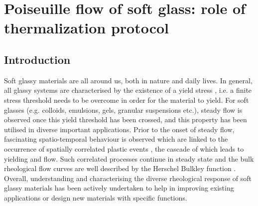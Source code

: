\pagestyle{fancy}
\fancyhf{}
\renewcommand{\headrulewidth}{0pt}
\fancyfoot[C]{\leftmark}
\fancyhead[R]{\thepage}
\doublespacing
\chapter{Poiseuille flow of soft glass: role of thermalization protocol}\label{chap5}

\noindent{}


\section{Introduction}

Soft glassy materials are all around us, both in nature and daily lives. In general, all glassy systems are characterised by the existence of a yield stress \cite{coussot2014yield, bonn2017yield, joshi2018yield}, i.e. a finite stress threshold needs to be overcome in order for the material to yield. For soft glasses (e.g. colloids, emulsions, gels, granular suspensions etc.), steady flow is observed once this yield threshold has been crossed, and this property has been utilised in diverse important applications. Prior to the onset of steady flow, fascinating spatio-temporal behaviour \cite{rodney2011modeling} is observed which are linked to the  occurrence of spatially correlated plastic events \cite{bocquet2009kinetic, nicolas2018deformation}, the cascade of which leads to yielding and flow. Such correlated processes continue in steady state and the bulk rheological flow curves are well described by the Herschel Bulkley function \cite{bonn2017yield}. Overall,
understanding and characterising the diverse rheological response \cite{bonn2017yield, joshi2018yield, tanner2018aspects, semwogerere2008shear, khabaz2021thermodynamics, jacob2019rheological, agarwal2019signatures, biswas2021quantifying, sriram2010active} of soft glassy materials has been actively undertaken to help in improving existing applications or design new materials with specific functions.

